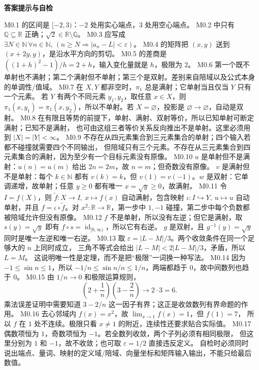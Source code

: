 \documentclass[UTF8,fontset=none,a4paper,11pt]{ctexart}
\theoremstyle{foundation-definition}
\theoremstyle{foundation-theorem}
\theoremstyle{foundation-proposition}
\theoremstyle{foundation-example}
\theoremstyle{foundation-remark}
\theoremstyle{foundation-theorem}
\newenvironment{answerkey}{%
\begin{mdframed}[backgroundcolor=examplebg,linecolor=examplepurple,linewidth=1.0pt,
  leftline=true,rightline=false,topline=false,bottomline=false,
  skipabove=7pt,skipbelow=8pt,innerleftmargin=10pt,innerrightmargin=8pt,
  innertopmargin=6pt,innerbottommargin=6pt]
{\sffamily\bfseries\color{examplepurple}答案提示与自检}\par\smallskip\small
}{\end{mdframed}}
\begin{document}
\begin{answerkey}
M0.1 的区间是 \([-2,3)\)：\(-2\) 处用实心端点，\(3\) 处用空心端点。
M0.2 中只有 \(\mathbb Q\subseteq\mathbb R\) 正确；\(\sqrt2\in\mathbb R\setminus\mathbb Q\)。
M0.3 应写成
\(\exists N\in\mathbb N\,\forall n\in\mathbb N,\,
(n\geq N\Rightarrow |a_n-L|<\varepsilon)\)。
M0.4 的矩阵把 \((x,y)\) 送到 \((x+2y,y)\)，是沿水平方向的剪切。
M0.5 的差商是 \(((1+h)^2-1)/h=2+h\)，输入变化量就是 \(h\)，极限为 \(2\)。
M0.6 第一个既不单射也不满射；第二个满射但不单射；第三个是双射。差别来自陪域以及公式本身的单调性/值域。
M0.7 在 \(X,Y\) 都非空时，\(\pi_1\) 总是满射；它单射当且仅当 \(Y\) 只有一个元素。
若 \(Y\) 有两个不同元素 \(y_1,y_2\)，取任意 \(x\in X\)，则
\(\pi_1(x,y_1)=\pi_1(x,y_2)\)，所以不单射。若 \(X=\varnothing\)，投影是
\(\varnothing\to\varnothing\)，自动是双射。
M0.8 在有限且等势的前提下，单射、满射、双射等价，所以已知单射可断定满射；已知不是满射，
也可由这组三者等价关系反向推出不是单射。这里必须用到 \(|X|=|Y|<\infty\)。
M0.9 不存在从四元素集合到三元素集合的单射；四个输入若都不碰撞就需要四个不同输出，
但陪域只有三个元素。不存在从三元素集合到四元素集合的满射，因为至少有一个目标元素没有原像。
M0.10 \(u\) 是单射但不是满射：\(u(n)=u(m)\) 给出 \(2n=2m\)，故 \(n=m\)；但奇数没有原像。
\(v\) 是满射但不是单射：每个 \(k\in\mathbb N\) 都有 \(v(k)=k\)，但
\(v(1)=v(-1)\)。\(w\) 是双射：它单调递增，故单射；任意 \(y\geq0\) 都有唯一
\(x=\sqrt y\geq0\)，故满射。
M0.11 令 \(I=f(X)\)，则
\(\widetilde f:X\to I,\ x\mapsto f(x)\) 自动满射，包含映射
\(\iota:I\hookrightarrow Y,\ u\mapsto u\) 自动单射，并且
\(f=\iota\circ\widetilde f\)。对 \(x^2:\mathbb R\to\mathbb R\)，第一步中
\(1,-1\) 碰撞，第二步中每个负数都被陪域允许但没有原像。
M0.12 \(f\) 不是单射，所以没有左逆；但它是满射，取
\(s(y)=\sqrt y\) 即有 \(f\circ s=\operatorname{id}_{[0,\infty)}\)，所以它有右逆。
\(g\) 是双射，且 \(g^{-1}(y)=\sqrt y\) 同时是唯一左逆和唯一右逆。
M0.13 取 \(\varepsilon=|L-M|/3\)。两个收敛条件在同一个足够大的 \(n\) 上同时成立，
三角不等式会给出 \(|L-M|<2|L-M|/3\)，矛盾，所以 \(L=M\)。
这说明唯一性是定理，而不是把“极限”一词换一种写法。
M0.14 因为 \(-1\le\sin n\le1\)，所以
\(-1/n\le\sin n/n\le1/n\)，两端都趋于 \(0\)，故中间数列也趋于 \(0\)。
M0.15 由 \(1/n\to0\) 和极限运算规则，
\[
\left(2+\frac1n\right)\left(3-\frac2n\right)\longrightarrow2\cdot3=6.
\]
乘法误差证明中需要知道 \(3-2/n\) 这一因子有界；这正是收敛数列有界命题的作用。
M0.16 去心邻域内 \(f(x)=x^2\)，故 \(\lim_{x\to1}f(x)=1\)，但 \(f(1)=7\)，
所以 \(f\) 在 \(1\) 处不连续。极限只看 \(x\ne1\) 的附近，连续性还要求贴合实际值。
M0.17 偶数项恒为 \(1\)，奇数项恒为 \(-1\)。若全数列收敛，两个子列必须有相同极限，
但这里分别为 \(1\) 和 \(-1\)，故不收敛；也可取 \(\varepsilon=1/2\) 直接违反定义。
自检时必须同时说出端点、量词、映射的定义域/陪域、向量坐标和矩阵输入输出，不能只给最后数值。
\end{answerkey}
\end{document}
